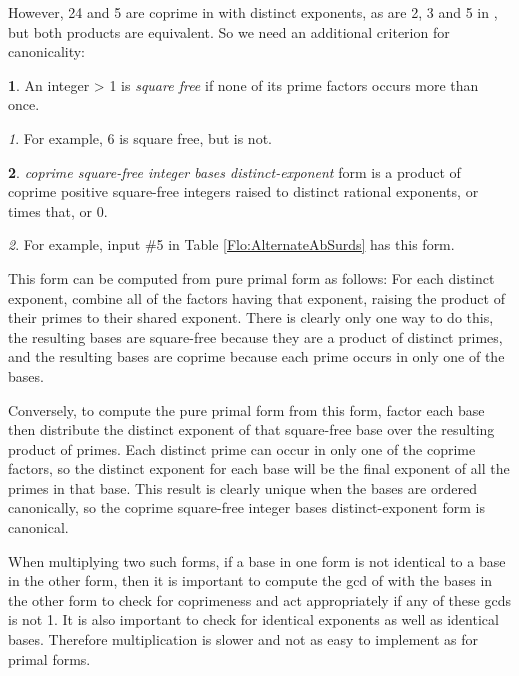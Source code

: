 \documentclass[12pt,english]{article}
\theoremstyle{definition}
\newtheorem*{defn*}{\protect\definitionname}
\theoremstyle{remark}
\newtheorem*{rem*}{\protect\remarkname}
\theoremstyle{plain}
\theoremstyle{plain}
\providecommand{\definitionname}{Definition}
\providecommand{\remarkname}{Remark}
\begin{document}
However, 24 and 5 are coprime in  with distinct
exponents, as are 2, 3 and 5 in , but
both products are equivalent. So we need an additional criterion for
canonicality:
\begin{defn*}
An integer > 1 is \textsl{square free} if none of its prime factors
occurs more than once.\end{defn*}
\begin{rem*}
For example, 6 is square free, but  is not.\end{rem*}
\begin{defn*}
\textsl{coprime square-free integer bases distinct-exponent} form
is a product of coprime positive square-free integers raised to distinct
rational exponents, or {\small } times that, or 0.\end{defn*}
\begin{rem*}
For example, input \#5 in Table \ref{Flo:AlternateAbSurds} has this
form.
\end{rem*}
This form can be computed from pure primal form as follows: For each
distinct exponent, combine all of the factors having that exponent,
raising the product of their primes to their shared exponent. There
is clearly only one way to do this, the resulting bases are square-free
because they are a product of distinct primes, and the resulting bases
are coprime because each prime occurs in only one of the bases.

Conversely, to compute the pure primal form from this form, factor
each base then distribute the distinct exponent of that square-free
base over the resulting product of primes. Each distinct prime can
occur in only one of the coprime factors, so the distinct exponent
for each base will be the final exponent of all the primes in that
base. This result is clearly unique when the bases are ordered canonically,
so the coprime square-free integer bases distinct-exponent form is
canonical.

When multiplying two such forms, if a base  in one form is not
identical to a base in the other form, then it is important to compute
the gcd of  with the bases in the other form to check for coprimeness
and act appropriately if any of these gcds is not 1. It is also important
to check for identical exponents as well as identical bases. Therefore
multiplication is slower and not as easy to implement as for primal
forms.
\end{document}
